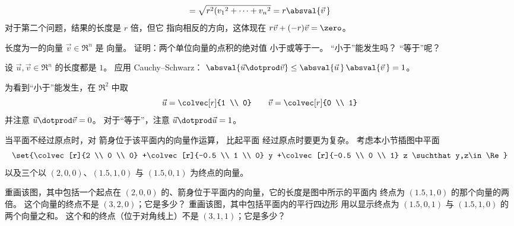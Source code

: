 \begin{exercises}
\begin{answer}
\begin{equation*}
        =\sqrt{r^2({v_1}^2+\cdots+{v_n}^2}     
        =r\absval{\vec{v}\,}
      \end{equation*}
      对于第二个问题，结果的长度是 \( r \) 倍，但它
      指向相反的方向，这体现在
      \( r\vec{v}+(-r)\vec{v}=\zero \)。  
    \end{answer}
  \recommended \item 
    长度为一的向量 \( \vec{v}\in\Re^n \) 是
    向量。
    证明：两个单位向量的点积的绝对值
    小于或等于一。
    “小于”能发生吗？
    “等于”呢？
    \begin{answer}
      设 \( \vec{u},\vec{v}\in\Re^n \) 的长度都是 \( 1 \)。
      应用 Cauchy–Schwarz：
      $\absval{\vec{u}\dotprod\vec{v}}
             \leq\absval{\vec{u}\,}\,\absval{\vec{v}\,}=1$。

      为看到“小于”能发生，在 \( \Re^2 \) 中取
      \begin{equation*}
        \vec{u}=\colvec[r]{1 \\ 0}
        \qquad
        \vec{v}=\colvec[r]{0 \\ 1}
      \end{equation*}
      并注意 \( \vec{u}\dotprod\vec{v}=0 \)。
      对于“等于”，注意 \( \vec{u}\dotprod\vec{u}=1 \)。  
    \end{answer}
  \item 
    当平面不经过原点时，对
    箭身位于该平面内的向量作运算，
    比起平面
    经过原点时要更为复杂。
    考虑本小节插图中平面 
    \begin{equation*}
      \set{\colvec[r]{2 \\ 0 \\ 0}
            +\colvec[r]{-0.5 \\ 1 \\ 0} y
            +\colvec[r]{-0.5 \\ 0 \\ 1} z
            \suchthat y,z\in\Re}
    \end{equation*}
    以及三个以
    $(2,0,0)$、$(1.5,1,0)$ 与 $(1.5,0,1)$ 为终点的向量。
    \begin{exparts}
      \partsitem 重画该图，其中包括一个起点在 $(2,0,0)$ 
        的、箭身位于平面内的向量，它的长度是图中所示的平面内
        终点为 $(1.5,1,0)$ 的那个向量的两倍。
        这个向量的终点不是 $(3,2,0)$；它是多少？
      \partsitem 重画该图，其中包括平面内的平行四边形 
        用以显示终点为 $(1.5,0,1)$ 与 $(1.5,1,0)$ 
        的两个向量之和。
        这个和的终点（位于对角线上）不是 $(3,1,1)$；它是多少？
    \end{exparts}

\end{exercises}
